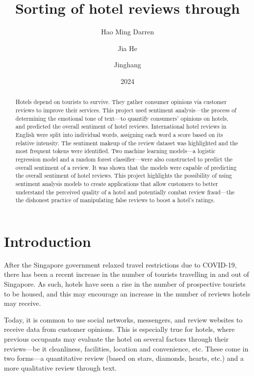 \documentclass[12pt, a4paper]{pancake-article}
\title{Sorting \tint{sentiments} of hotel reviews through \tint{machine learning}}
\author{\tint{Yap} Hao Ming Darren \and \tint{Tan} Jia He \and \tint{Fu} Jinghang}
\date{2024}
\begin{document}
\maketitle
\thispagestyle{empty}

\pagebreak

\tableofcontents

\begin{abstract}
	Hotels depend on tourists to survive. They gather consumer opinions via customer
	reviews to improve their services. This project used sentiment analysis---the
	process of determining the emotional tone of text---to quantify consumers'
	opinions on hotels, and predicted the overall sentiment of hotel reviews.
	International hotel reviews in English were split into individual words,
	assigning each word a score based on its relative intensity. The sentiment
	makeup of the review dataset was highlighted and the most frequent tokens were
	identified. Two machine learning models---a logistic regression model and a random
	forest classifier---were also constructed to predict the overall sentiment of a
	review. It was shown that the models were capable of predicting the overall
	sentiment of hotel reviews. This project highlights the possibility of using
	sentiment analysis models to create applications that allow customers to better
	understand the perceived quality of a hotel and potentially combat review fraud---the
	the dishonest practice of manipulating false reviews to boost a hotel's ratings.
\end{abstract}

\section{Introduction}%
After the Singapore government relaxed travel restrictions due to COVID-19,
there has been a recent increase in the number of tourists travelling in and out of Singapore.
As such, hotels have seen a rise in the number of prospective tourists to be housed,
and this may encourage an increase in the number of reviews hotels may receive.

Today, it is common to use social networks, messengers, and review websites
to receive data from customer opinions. This is especially true for hotels,
where previous occupants may evaluate the hotel on several factors through their
reviews---be it cleanliness, facilities, location and convenience, etc.
These come in two forms---a quantitative review (based on stars, diamonds,
hearts, etc.) and a more qualitative review through text.
\end{document}
